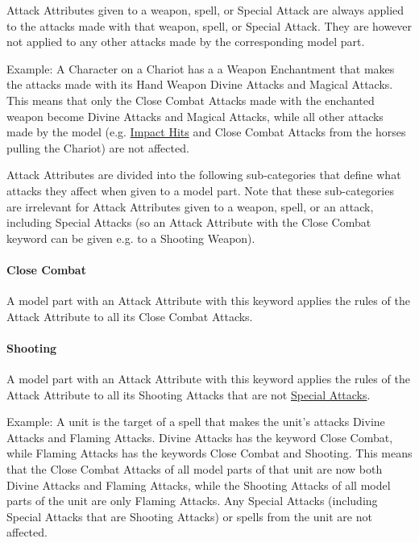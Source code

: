 Attack Attributes given to a weapon, spell, or Special Attack are always applied to the attacks made with that weapon, spell, or Special Attack. They are however not applied to any other attacks made by the corresponding model part.

Example: A Character on a Chariot has a a Weapon Enchantment that makes the attacks made with its Hand Weapon Divine Attacks and Magical Attacks. This means that only the Close Combat Attacks made with the enchanted weapon become Divine Attacks and Magical Attacks, while all other attacks made by the model (e.g. \hyperref[impact_hits]{Impact Hits} and Close Combat Attacks from the horses pulling the Chariot) are not affected.

Attack Attributes are divided into the following sub-categories that define what attacks they affect when given to a model part. Note that these sub-categories are irrelevant for Attack Attributes given to a weapon, spell, or an attack, including Special Attacks (so an Attack Attribute with the Close Combat keyword can be given e.g. to a Shooting Weapon).

\paragraph{Close Combat}

A model part with an Attack Attribute with this keyword applies the rules of the Attack Attribute to all its Close Combat Attacks.

\paragraph{Shooting}

A model part with an Attack Attribute with this keyword applies the rules of the Attack Attribute to all its Shooting Attacks that are not \hyperref[special_attacks]{Special Attacks}.

Example: A unit is the target of a spell that makes the unit's attacks Divine Attacks and Flaming Attacks. Divine Attacks has the keyword Close Combat, while Flaming Attacks has the keywords Close Combat and Shooting. This means that the Close Combat Attacks of all model parts of that unit are now both Divine Attacks and Flaming Attacks, while the Shooting Attacks of all model parts of the unit are only Flaming Attacks. Any Special Attacks (including Special Attacks that are Shooting Attacks) or spells from the unit are not affected.

